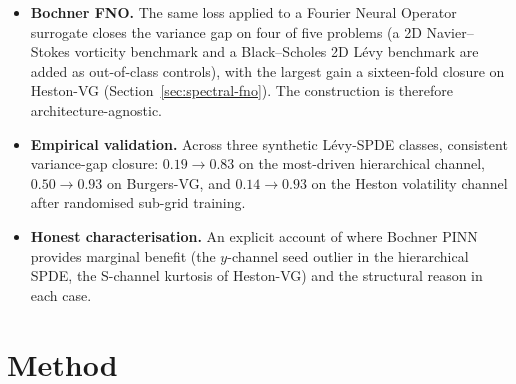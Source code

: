 \documentclass[10pt]{elsarticle}
\begin{document}
\begin{itemize}
\item \textbf{Bochner FNO.} The same loss applied to a
Fourier Neural Operator surrogate closes the variance gap on four
of five problems (a 2D Navier--Stokes vorticity benchmark and a
Black--Scholes 2D L\'evy benchmark are added as out-of-class
controls), with the largest gain a sixteen-fold closure on
Heston-VG (Section~\ref{sec:spectral-fno}). The construction is
therefore architecture-agnostic.

\item \textbf{Empirical validation.} Across three synthetic L\'evy-SPDE
classes, consistent variance-gap closure: \(0.19 \to 0.83\) on the
most-driven hierarchical channel, \(0.50 \to 0.93\) on Burgers-VG,
and \(0.14 \to 0.93\) on the Heston volatility channel after
randomised sub-grid training.

\item \textbf{Honest characterisation.} An explicit account of where
Bochner PINN provides marginal benefit (the \(y\)-channel seed
outlier in the hierarchical SPDE, the S-channel kurtosis of Heston-VG)
and the structural reason in each case.
\end{itemize}

\section{Method}
\label{sec:method}
\end{document}
